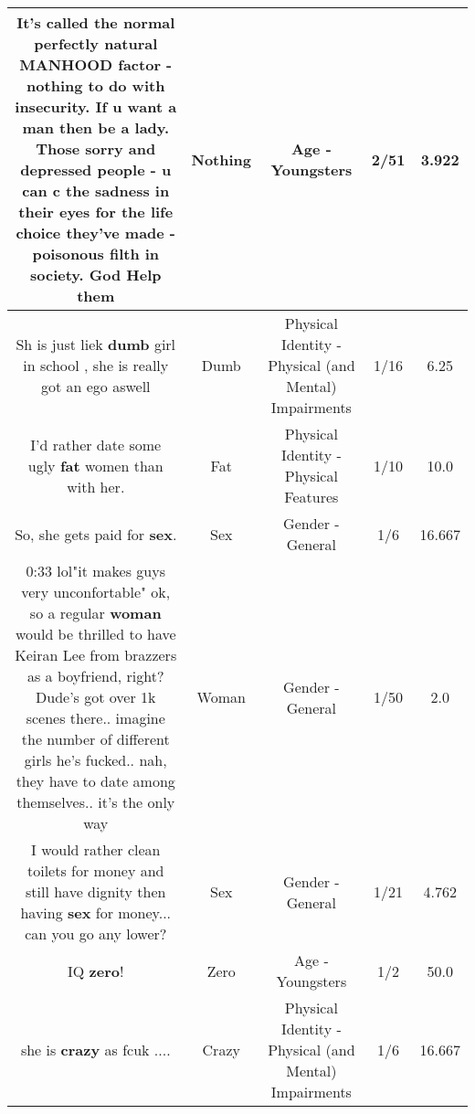 \documentclass[11pt]{article}
\newlength\mylength
\begin{document}
\begin{center}
\begin{longtable}{|C{.65\mylength}|C{.30\mylength}|C{.12\mylength}|C{.12\mylength}|C{.12\mylength}|}
  \small It's called the normal perfectly natural MANHOOD factor - \textbf{nothing} to do with insecurity. If u want a man then be a lady. Those sorry and depressed people - u can c the sadness in their eyes for the life choice they've made - poisonous filth in society. God Help them\normalsize   & Nothing & Age - Youngsters & 2/51 & 3.922 \\  \hline
  \small Sh is just liek \textbf{dumb} girl in school , she is really got an ego aswell\normalsize   & Dumb & Physical Identity - Physical (and Mental) Impairments & 1/16 & 6.25 \\  \hline
  \small I'd rather date some ugly \textbf{fat} women than with her.\normalsize   & Fat & Physical Identity - Physical Features & 1/10 & 10.0 \\  \hline
  \small So, she gets paid for \textbf{sex}.\normalsize   & Sex & Gender - General & 1/6 & 16.667 \\  \hline
  \small 0:33 lol"it makes guys very unconfortable" ok, so a regular \textbf{woman} would be thrilled to have Keiran Lee from brazzers as a boyfriend, right? Dude's got over 1k scenes there.. imagine the number of different girls he's fucked.. nah, they have to date among themselves.. it's the only way\normalsize   & Woman & Gender - General & 1/50 & 2.0 \\  \hline
  \small I would rather clean toilets for money and still have dignity then having \textbf{sex} for money... can you go any lower?\normalsize   & Sex & Gender - General & 1/21 & 4.762 \\  \hline
  \small IQ  \textbf{zero}!\normalsize   & Zero & Age - Youngsters & 1/2 & 50.0 \\  \hline
  \small she is \textbf{crazy} as fcuk ....\normalsize   & Crazy & Physical Identity - Physical (and Mental) Impairments & 1/6 & 16.667 \\  \hline

\end{longtable}
\end{center}
\end{document}
